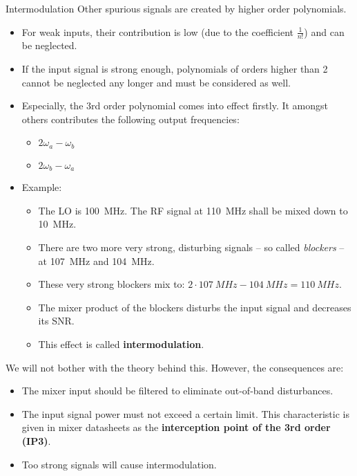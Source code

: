 \begin{refsection}
\begin{excursus}{Intermodulation}
	Other spurious signals are created by higher order polynomials.
	\begin{itemize}
		\item For weak inputs, their contribution is low (due to the coefficient $\frac{1}{n!}$) and can be neglected.
		\item If the input signal is strong enough, polynomials of orders higher than 2 cannot be neglected any longer and must be considered as well.
		\item Especially, the 3rd order polynomial comes into effect firstly. It amongst others contributes the following output frequencies:
		\begin{itemize}
			\item $2 \omega_a - \omega_b$
			\item $2 \omega_b - \omega_a$
		\end{itemize}
		\item Example:
		\begin{itemize}
			\item The \ac{LO} is \SI{100}{MHz}. The \ac{RF} signal at \SI{110}{MHz} shall be mixed down to \SI{10}{MHz}.
			\item There are two more very strong, disturbing signals -- so called \emph{blockers} -- at \SI{107}{MHz} and \SI{104}{MHz}.
			\item These very strong blockers mix to: $2 \cdot \SI{107}{MHz} - \SI{104}{MHz} = \SI{110}{MHz}$.
			\item The mixer product of the blockers disturbs the input signal and decreases its \ac{SNR}.
			\item This effect is called  \textbf{intermodulation}.
		\end{itemize}
	\end{itemize}

	We will not bother with the theory behind this. However, the consequences are:
	\begin{itemize}
		\item The mixer input should be filtered to eliminate out-of-band disturbances.
		\item The input signal power must not exceed a certain limit. This characteristic is given in mixer datasheets as the  \textbf{interception point of the 3rd order (IP3)}.
		\item Too strong signals will cause intermodulation.
	\end{itemize}
\end{excursus}


\end{refsection}
